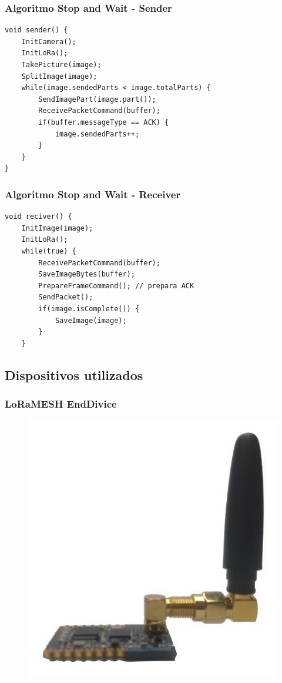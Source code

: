 \documentclass[12pt]{beamer}
\begin{document}
\begin{frame}[t,fragile]
    \frametitle{Algoritmo Stop and Wait - Sender}
    \begin{lstlisting}[basicstyle=\small]
void sender() {
    InitCamera();
    InitLoRa();
    TakePicture(image);
    SplitImage(image);
    while(image.sendedParts < image.totalParts) {
        SendImagePart(image.part());
        ReceivePacketCommand(buffer);
        if(buffer.messageType == ACK) {
            image.sendedParts++;
        }
    }
}
    \end{lstlisting}
\end{frame}

\begin{frame}[t,fragile]
    \frametitle{Algoritmo Stop and Wait - Receiver}
    \begin{lstlisting}[basicstyle=\small]
void reciver() {
    InitImage(image);
    InitLoRa();
    while(true) {
        ReceivePacketCommand(buffer);
        SaveImageBytes(buffer);
        PrepareFrameCommand(); // prepara ACK
        SendPacket();
        if(image.isComplete()) {
            SaveImage(image);
        }
    }
    \end{lstlisting}
\end{frame}

\subsection{Dispositivos utilizados}
\begin{frame}
    \frametitle{LoRaMESH EndDivice}
    \begin{figure}[!h]
        \centering
        \includegraphics[width=.60\textwidth]{lora}
    \end{figure}
\end{frame}
\end{document}
